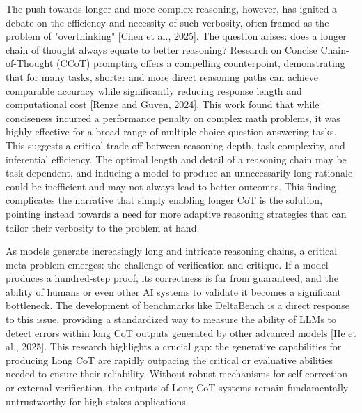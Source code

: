 \documentclass[11pt]{article}
\begin{document}
The push towards longer and more complex reasoning, however, has ignited a debate on the efficiency and necessity of such verbosity, often framed as the problem of "overthinking" [Chen et al., 2025]. The question arises: does a longer chain of thought always equate to better reasoning? Research on Concise Chain-of-Thought (CCoT) prompting offers a compelling counterpoint, demonstrating that for many tasks, shorter and more direct reasoning paths can achieve comparable accuracy while significantly reducing response length and computational cost [Renze and Guven, 2024]. This work found that while conciseness incurred a performance penalty on complex math problems, it was highly effective for a broad range of multiple-choice question-answering tasks. This suggests a critical trade-off between reasoning depth, task complexity, and inferential efficiency. The optimal length and detail of a reasoning chain may be task-dependent, and inducing a model to produce an unnecessarily long rationale could be inefficient and may not always lead to better outcomes. This finding complicates the narrative that simply enabling longer CoT is the solution, pointing instead towards a need for more adaptive reasoning strategies that can tailor their verbosity to the problem at hand.

As models generate increasingly long and intricate reasoning chains, a critical meta-problem emerges: the challenge of verification and critique. If a model produces a hundred-step proof, its correctness is far from guaranteed, and the ability of humans or even other AI systems to validate it becomes a significant bottleneck. The development of benchmarks like DeltaBench is a direct response to this issue, providing a standardized way to measure the ability of LLMs to detect errors within long CoT outputs generated by other advanced models [He et al., 2025]. This research highlights a crucial gap: the generative capabilities for producing Long CoT are rapidly outpacing the critical or evaluative abilities needed to ensure their reliability. Without robust mechanisms for self-correction or external verification, the outputs of Long CoT systems remain fundamentally untrustworthy for high-stakes applications.
\end{document}
